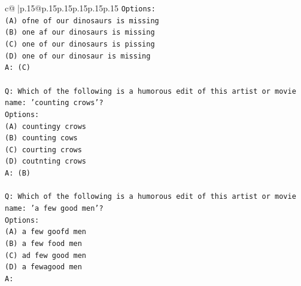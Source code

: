 \documentclass{article}
\begin{document}
{\begin{supertabular}{c@{$\;$}|p{.15\linewidth}@{}p{.15\linewidth}p{.15\linewidth}p{.15\linewidth}p{.15\linewidth}p{.15\linewidth}}
{{{\texttt{Options:} \\
\texttt{(A) ofne of our dinosaurs is missing} \\
\texttt{(B) one af our dinosaurs is missing} \\
\texttt{(C) one of our dinosaurs is pissing} \\
\texttt{(D) one of our dinosaur is missing} \\
\texttt{A: (C)} \\
\\ 
\texttt{Q: Which of the following is a humorous edit of this artist or movie name: 'counting crows'?} \\
\texttt{Options:} \\
\texttt{(A) countingy crows} \\
\texttt{(B) counting cows} \\
\texttt{(C) courting crows} \\
\texttt{(D) coutnting crows} \\
\texttt{A: (B)} \\
\\ 
\texttt{Q: Which of the following is a humorous edit of this artist or movie name: 'a few good men'?} \\
\texttt{Options:} \\
\texttt{(A) a few goofd men} \\
\texttt{(B) a few food men} \\
\texttt{(C) ad few good men} \\
\texttt{(D) a fewagood men} \\
\texttt{A:} \\
            }
        }
    }
     \\ \\


\end{supertabular}}
\end{document}
